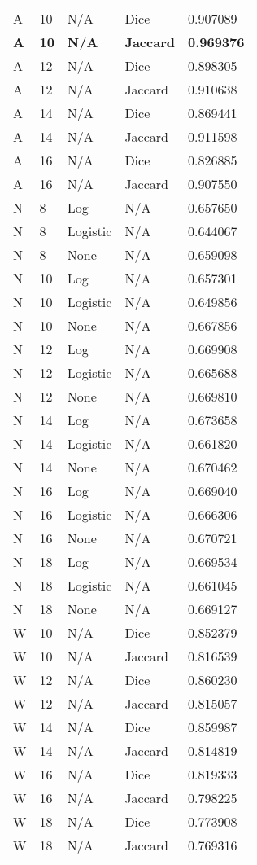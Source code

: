 \documentclass{article}
\begin{document}
\begin{center}
\begin{supertabular}{| l | l | l | l | l |}
            A & 10 & N/A & Dice & 0.907089 \\
            \textbf{A} & \textbf{10} & \textbf{N/A} & \textbf{Jaccard} & \textbf{0.969376} \\
            A & 12 & N/A & Dice & 0.898305 \\
            A & 12 & N/A & Jaccard & 0.910638 \\
            A & 14 & N/A & Dice & 0.869441 \\
            A & 14 & N/A & Jaccard & 0.911598 \\
            A & 16 & N/A & Dice & 0.826885 \\
            A & 16 & N/A & Jaccard & 0.907550 \\
            N & 8 & Log & N/A & 0.657650 \\
            N & 8 & Logistic & N/A & 0.644067 \\
            N & 8 & None & N/A & 0.659098 \\
            N & 10 & Log & N/A & 0.657301 \\
            N & 10 & Logistic & N/A & 0.649856 \\
            N & 10 & None & N/A & 0.667856 \\
            N & 12 & Log & N/A & 0.669908 \\
            N & 12 & Logistic & N/A & 0.665688 \\
            N & 12 & None & N/A & 0.669810 \\
            N & 14 & Log & N/A & 0.673658 \\
            N & 14 & Logistic & N/A & 0.661820 \\
            N & 14 & None & N/A & 0.670462 \\
            N & 16 & Log & N/A & 0.669040 \\
            N & 16 & Logistic & N/A & 0.666306 \\
            N & 16 & None & N/A & 0.670721 \\
            N & 18 & Log & N/A & 0.669534 \\
            N & 18 & Logistic & N/A & 0.661045 \\
            N & 18 & None & N/A & 0.669127 \\
            W & 10 & N/A & Dice & 0.852379 \\
            W & 10 & N/A & Jaccard & 0.816539 \\
            W & 12 & N/A & Dice & 0.860230 \\
            W & 12 & N/A & Jaccard & 0.815057 \\
            W & 14 & N/A & Dice & 0.859987 \\
            W & 14 & N/A & Jaccard & 0.814819 \\
            W & 16 & N/A & Dice & 0.819333 \\
            W & 16 & N/A & Jaccard & 0.798225 \\
            W & 18 & N/A & Dice & 0.773908 \\
            W & 18 & N/A & Jaccard & 0.769316 \\


\end{supertabular}
\end{center}
\end{document}
